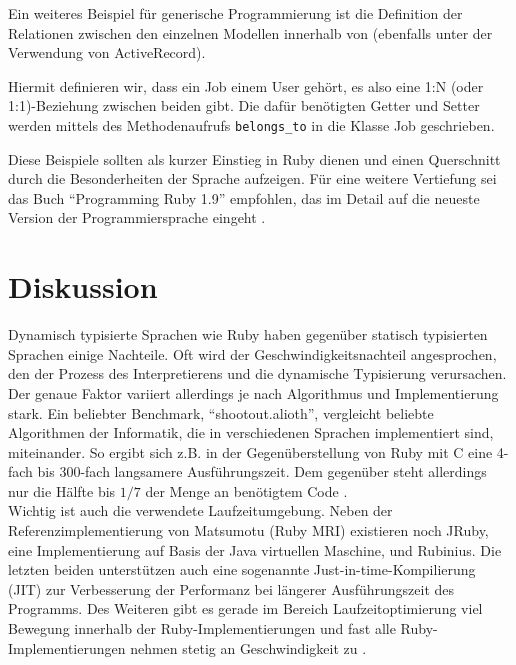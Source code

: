 Ein weiteres Beispiel für generische Programmierung ist die Definition der Relationen zwischen den einzelnen Modellen innerhalb von  (ebenfalls unter der Verwendung von ActiveRecord).
\begin{ruby}[label=app/models/job.rb]
   
   
\end{ruby}

Hiermit definieren wir, dass ein Job einem User gehört, es also eine 1:N (oder 1:1)-Beziehung zwischen beiden gibt. Die dafür benötigten Getter und Setter werden mittels des Methodenaufrufs \texttt{belongs\_to} in die Klasse Job geschrieben.

Diese Beispiele sollten als kurzer Einstieg in Ruby dienen und einen Querschnitt durch die Besonderheiten der Sprache aufzeigen.
Für eine weitere Vertiefung sei das Buch "`Programming Ruby 1.9"' empfohlen, das im Detail auf die neueste Version der Programmiersprache eingeht \citep{hunt_programming_2009}.



\section{Diskussion}


Dynamisch typisierte Sprachen wie Ruby haben gegenüber statisch typisierten Sprachen einige Nachteile. Oft wird der Geschwindigkeitsnachteil angesprochen, den der Prozess des Interpretierens und die dynamische Typisierung verursachen.
Der genaue Faktor variiert allerdings je nach Algorithmus und Implementierung stark. Ein beliebter Benchmark, "`shootout.alioth"', vergleicht beliebte Algorithmen der Informatik, die in verschiedenen Sprachen implementiert sind, miteinander. So ergibt sich z.B. in der Gegenüberstellung von Ruby mit C eine 4-fach bis 300-fach langsamere Ausführungszeit. Dem gegenüber steht allerdings nur die Hälfte bis $1/7$ der Menge an benötigtem Code \citep{computer_language_benchmarks_game_ruby_2011}. \\
Wichtig ist auch die verwendete Laufzeitumgebung. Neben der Referenzimplementierung von Matsumotu (Ruby MRI) existieren noch JRuby, eine Implementierung auf Basis der Java virtuellen Maschine, und Rubinius. Die letzten beiden unterstützen auch eine sogenannte Just-in-time-Kompilierung (JIT) zur Verbesserung der Performanz bei längerer Ausführungszeit des Programms. Des Weiteren gibt es gerade im Bereich Laufzeitoptimierung viel Bewegung innerhalb der Ruby-Implementierungen und fast alle Ruby-Implementierungen nehmen stetig an Geschwindigkeit zu \citep{antonio_cangiano_great_2010}.


